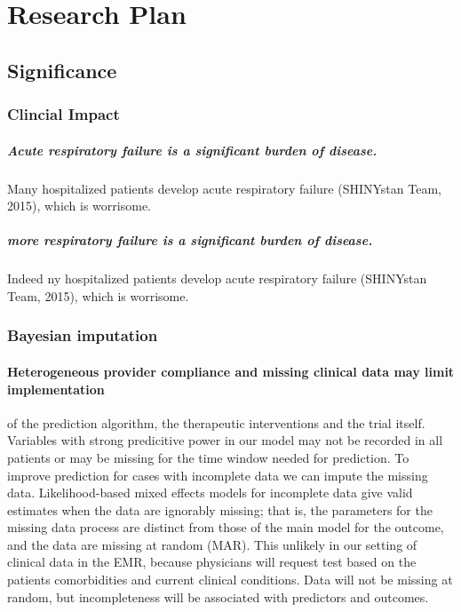 \documentclass[]{article}
\title{}
\author{}
\date{}
\begin{document}
\maketitle


\section{Research Plan}\label{research-plan}

\subsection{Significance}\label{significance}

\subsubsection{Clincial Impact}\label{clincial-impact}

\subparagraph{Acute respiratory failure is a significant burden of
disease.}\label{acute-respiratory-failure-is-a-significant-burden-of-disease.}

Many hospitalized patients develop acute respiratory failure (SHINYstan
Team, 2015), which is worrisome.

\subparagraph{more respiratory failure is a significant burden of
disease.}\label{more-respiratory-failure-is-a-significant-burden-of-disease.}

Indeed ny hospitalized patients develop acute respiratory failure
(SHINYstan Team, 2015), which is worrisome.

\subsubsection{Bayesian imputation}\label{bayesian-imputation}

\paragraph{Heterogeneous provider compliance and missing clinical data
may limit
implementation}\label{heterogeneous-provider-compliance-and-missing-clinical-data-may-limit-implementation}

of the prediction algorithm, the therapeutic interventions and the trial
itself. Variables with strong predicitive power in our model may not be
recorded in all patients or may be missing for the time window needed
for prediction. To improve prediction for cases with incomplete data we
can impute the missing data. Likelihood-based mixed effects models for
incomplete data give valid estimates when the data are ignorably
missing; that is, the parameters for the missing data process are
distinct from those of the main model for the outcome, and the data are
missing at random (MAR). This unlikely in our setting of clinical data
in the EMR, because physicians will request test based on the patients
comorbidities and current clinical conditions. Data will not be missing
at random, but incompleteness will be associated with predictors and
outcomes.
\end{document}
